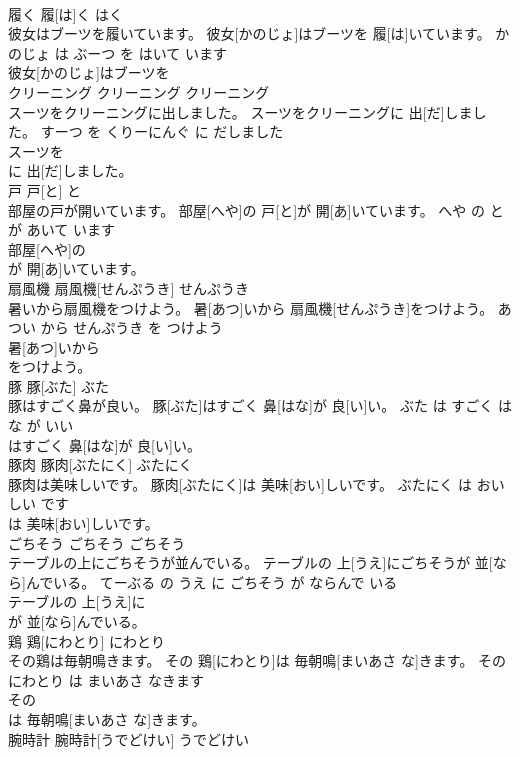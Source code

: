 \documentclass[8pt]{extreport}
\begin{document}
\begin{CJK}{UTF8}{min}
\\	履く	履[は]く	はく	
\\	彼女はブーツを履いています。	彼女[かのじょ]はブーツを 履[は]いています。	かのじょ は ぶーつ を はいて います	
\\	彼女[かのじょ]はブーツを
\\	クリーニング	クリーニング	クリーニング	
\\	スーツをクリーニングに出しました。	スーツをクリーニングに 出[だ]しました。	すーつ を くりーにんぐ に だしました	
\\	スーツを
\\	に 出[だ]しました。			
\\	戸	戸[と]	と	
\\	部屋の戸が開いています。	部屋[へや]の 戸[と]が 開[あ]いています。	へや の と が あいて います	
\\	部屋[へや]の
\\	が 開[あ]いています。			
\\	扇風機	扇風機[せんぷうき]	せんぷうき	
\\	暑いから扇風機をつけよう。	暑[あつ]いから 扇風機[せんぷうき]をつけよう。	あつい から せんぷうき を つけよう	
\\	暑[あつ]いから
\\	をつけよう。			
\\	豚	豚[ぶた]	ぶた	
\\	豚はすごく鼻が良い。	豚[ぶた]はすごく 鼻[はな]が 良[い]い。	ぶた は すごく はな が いい	
\\	はすごく 鼻[はな]が 良[い]い。			
\\	豚肉	豚肉[ぶたにく]	ぶたにく	
\\	豚肉は美味しいです。	豚肉[ぶたにく]は 美味[おい]しいです。	ぶたにく は おいしい です	
\\	は 美味[おい]しいです。			
\\	ごちそう	ごちそう	ごちそう	
\\	テーブルの上にごちそうが並んでいる。	テーブルの 上[うえ]にごちそうが 並[なら]んでいる。	てーぶる の うえ に ごちそう が ならんで いる	
\\	テーブルの 上[うえ]に
\\	が 並[なら]んでいる。			
\\	鶏	鶏[にわとり]	にわとり	
\\	その鶏は毎朝鳴きます。	その 鶏[にわとり]は 毎朝鳴[まいあさ な]きます。	その にわとり は まいあさ なきます	
\\	その
\\	は 毎朝鳴[まいあさ な]きます。			
\\	腕時計	腕時計[うでどけい]	うでどけい	

\end{CJK}
\end{document}
